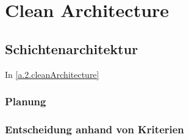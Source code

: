 
\chapter{Clean Architecture} \label{2.cleanArchitecture}

	\section{Schichtenarchitektur}
	In \cref{a.2.cleanArchitecture}
	
	\subsection{Planung}
	
	\subsection{Entscheidung anhand von Kriterien}